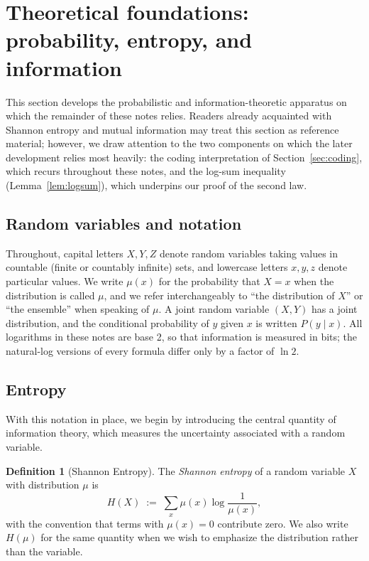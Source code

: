 \documentclass[10pt]{article}
\theoremstyle{definition}
\newtheorem{definition}[theorem]{Definition}
\theoremstyle{remark}
\begin{document}
\section{Theoretical foundations: probability, entropy, and information}
\label{sec:prelim}

This section develops the probabilistic and information-theoretic apparatus on which the remainder of these notes relies. Readers already acquainted with Shannon entropy and mutual information may treat this section as reference material; however, we draw attention to the two components on which the later development relies most heavily: the coding interpretation of Section~\ref{sec:coding}, which recurs throughout these notes, and the log-sum inequality (Lemma~\ref{lem:logsum}), which underpins our proof of the second law.

\subsection{Random variables and notation}

Throughout, capital letters $X, Y, Z$ denote random variables taking values in countable (finite or countably infinite) sets, and lowercase letters $x, y, z$ denote particular values. We write $\mu(x)$ for the probability that $X = x$ when the distribution is called $\mu$, and we refer interchangeably to ``the distribution of $X$'' or ``the ensemble'' when speaking of $\mu$. A joint random variable $(X, Y)$ has a joint distribution, and the conditional probability of $y$ given $x$ is written $P(y \mid x)$. All logarithms in these notes are base 2, so that information is measured in bits; the natural-log versions of every formula differ only by a factor of $\ln 2$.

\subsection{Entropy}

With this notation in place, we begin by introducing the central quantity of information theory, which measures the uncertainty associated with a random variable.

\begin{definition}[Shannon Entropy]
\label{def:entropy}
The \emph{Shannon entropy} of a random variable $X$ with distribution $\mu$ is
\[
H(X) \;:=\; \sum_{x} \mu(x) \log \frac{1}{\mu(x)},
\]
with the convention that terms with $\mu(x) = 0$ contribute zero. We also write $H(\mu)$ for the same quantity when we wish to emphasize the distribution rather than the variable.
\end{definition}
\end{document}
